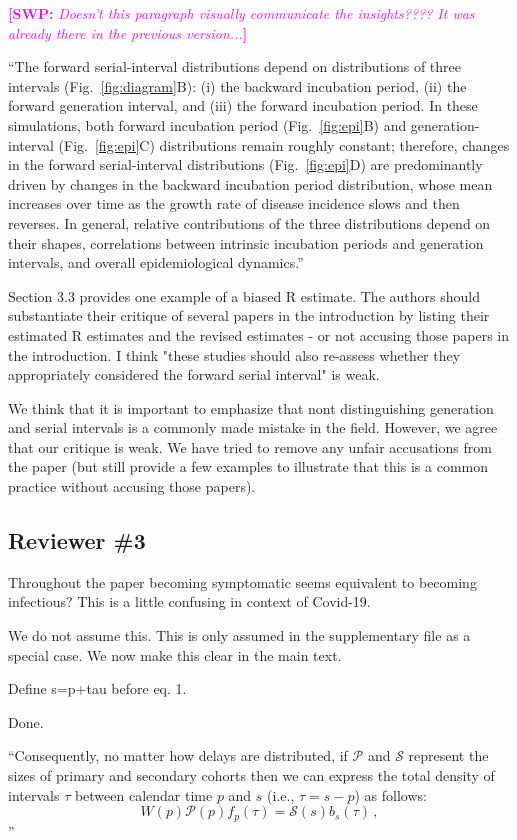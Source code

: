 \documentclass[12pt]{article}
\newcommand{\fref}[1]{Fig.~\ref{fig:#1}}
\newcommand{\rev}{\subsection*}
\newcommand{\revtext}{\textsf}
\newcommand{\comment}[3]{\textcolor{#1}{\textbf{[#2: }\textsl{#3}\textbf{]}}}
\newcommand{\swp}[1]{\comment{magenta}{SWP}{#1}}
\newcommand{\psymp}{\ensuremath{p}} %
\newcommand{\ssymp}{\ensuremath{s}} %
\newcommand{\psize}{{\mathcal P}} %
\newcommand{\ssize}{{\mathcal S}} %
\begin{document}
\swp{Doesn't this paragraph visually communicate the insights???? It was already there in the previous version...}

``The forward serial-interval distributions depend on distributions of three intervals
(\fref{diagram}B): (i) the backward incubation period, (ii) the forward generation interval, and (iii) the forward incubation period.
In these simulations, both forward incubation period (\fref{epi}B) and generation-interval (\fref{epi}C) distributions remain roughly constant;
therefore, changes in the forward serial-interval distributions (\fref{epi}D) are predominantly driven by changes in the backward incubation period distribution, whose mean increases over time as the growth rate of disease incidence slows and then reverses.
In general, relative contributions of the three distributions depend on their shapes, correlations between intrinsic incubation periods and generation intervals, and overall epidemiological dynamics.''

\revtext{Section 3.3 provides one example of a biased R estimate. The authors should substantiate their critique of several papers in the introduction by listing their estimated R estimates and the revised estimates - or not accusing those papers in the introduction. I think "these studies should also re-assess whether they appropriately considered the forward serial interval" is weak.}

We think that it is important to emphasize that nont distinguishing generation and serial intervals is a commonly made mistake in the field. 
However, we agree that our critique is weak.
We have tried to remove any unfair accusations from the paper (but still provide a few examples to illustrate that this is a common practice without accusing those papers).

\rev{Reviewer \#3}

\revtext{Throughout the paper becoming symptomatic seems equivalent to becoming infectious? This is a little confusing in context of Covid-19.}

We do not assume this. This is only assumed in the supplementary file as a special case. We now make this clear in the main text.

\revtext{Define s=p+tau before eq. 1.}

Done.

``Consequently, no matter how delays are distributed, if
$\mathcal P$ and $\mathcal S$ represent the sizes of primary and
secondary cohorts then we can express the total density of intervals $\tau$ between calendar time $\psymp$ and $\ssymp$ (i.e., $\tau=\ssymp-\psymp$) as follows:
\begin{equation}
W(\psymp) \psize(\psymp) f_\psymp(\tau) = \ssize(\ssymp) b_\ssymp(\tau) \,,
\end{equation}''
\end{document}
